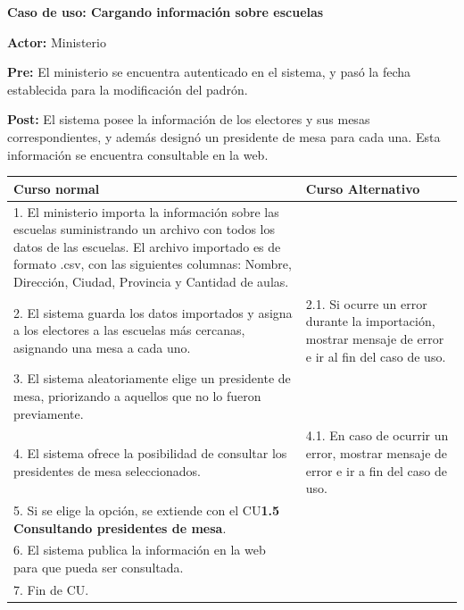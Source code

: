 \textbf{Caso de uso: Cargando información sobre escuelas}

\textbf{Actor:} Ministerio

\textbf{Pre:} El ministerio se encuentra autenticado en el sistema, y pasó la fecha establecida para la modificación del padrón.

\textbf{Post:} El sistema posee la información de los electores y sus mesas correspondientes, y además designó un presidente de mesa para cada una. Esta información se encuentra consultable en la web.


\begin{table}[h!]
	
 \begin{tabular}{|p{7.5cm} | p{7.5cm}|} 
 \hline
 \textbf{Curso normal} & \textbf{Curso Alternativo} \\
 \hline

1. El ministerio importa la información sobre las escuelas suministrando un archivo con todos los datos de las escuelas. El archivo importado es de formato .csv, con las siguientes columnas: Nombre, Dirección, Ciudad, Provincia y Cantidad de aulas. & \\
\hline

2. El sistema guarda los datos importados y asigna a los electores a las escuelas más cercanas, asignando una mesa a cada uno. &
2.1. Si ocurre un error durante la importación, mostrar mensaje de error e ir al fin del caso de uso. \\
\hline
3. El sistema aleatoriamente elige un presidente de mesa, priorizando a aquellos que no lo fueron previamente. & \\
\hline

4. El sistema ofrece la posibilidad de consultar los presidentes de mesa seleccionados. &
4.1. En caso de ocurrir un error, mostrar mensaje de error e ir a fin del caso de uso. \\
\hline
5. Si se elige la opción, se extiende con el CU\textbf{1.5 Consultando presidentes de mesa}. & \\
\hline

6. El sistema publica la información en la web para que pueda ser consultada. & \\
\hline

7. Fin de CU. & \\
\hline

 \end{tabular}

\end{table}






